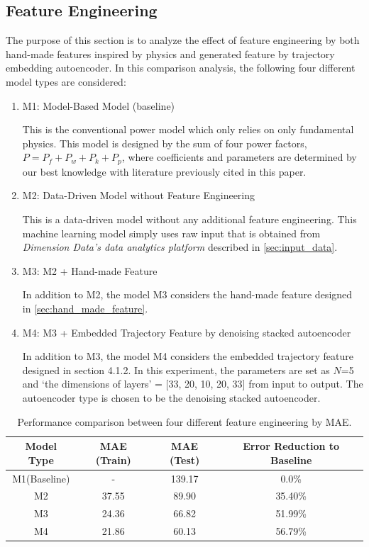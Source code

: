 \documentclass[runningheads]{llncs}
\begin{document}
\subsection{Feature Engineering}
The purpose of this section is to analyze the effect of feature engineering by both hand-made features inspired by physics and generated feature by trajectory embedding autoencoder. In this comparison analysis, the following four different model types are considered:
\begin{enumerate}
 \item M1: Model-Based Model (baseline)

       This is the conventional power model which only relies on only
       fundamental physics. This model is designed by the sum of four
       power factors, $P=P_f+P_w+P_k+P_p$, where coefficients and
       parameters are determined by our best knowledge with literature
       previously cited in this paper.

\item M2: Data-Driven Model without Feature Engineering
      
      This is a data-driven model without any additional feature engineering. This machine learning model simply uses raw input that is obtained from {\it{Dimension Data's data analytics platform}} described in \ref{sec:input_data}. 
      
\item M3: M2 + Hand-made Feature 
      
      In addition to M2, the model M3 considers the hand-made feature designed in \ref{sec:hand_made_feature}.

\item M4: M3 + Embedded Trajectory Feature by denoising stacked autoencoder
      
      In addition to M3, the model M4 considers the embedded trajectory feature designed in section 4.1.2. In this experiment, the parameters are set as $N$=5 and ‘the dimensions of layers' = [33, 20, 10, 20, 33] from input to output. The autoencoder type is chosen to be the denoising stacked autoencoder.
\end{enumerate}

 \begin{table}[t]
  \begin{center}
   \caption{Performance comparison between four different feature engineering by MAE.}
   \label{tab1:MAE_result}
   \begin{tabular}{|c|c|c|c|}
    \hline
    Model Type & MAE (Train) & MAE (Test) & Error Reduction to Baseline\\
    \hline
    M1(Baseline) & - & 139.17 & 0.0\% \\
    M2 & 37.55 & 89.90 & 35.40\% \\
    M3 & 24.36 & 66.82 & 51.99\% \\
    M4 & 21.86 & 60.13 & 56.79\% \\
    \hline
   \end{tabular}
  \end{center}
 \end{table}
\end{document}
